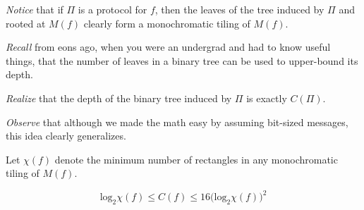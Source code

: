 \documentclass[12pt]{article}
\begin{document}
\begin{description}
\item \emph{Notice} that if $\Pi$ is a protocol for $f$, then the leaves of the tree induced by $\Pi$ and rooted at $M(f)$ clearly form a monochromatic tiling of $M(f)$.
\item \emph{Recall} from eons ago, when you were an undergrad and had to know useful things, that the number of leaves in a binary tree can be used to upper-bound its depth.
\item \emph{Realize} that the depth of the binary tree induced by $\Pi$ is exactly $C(\Pi)$.
\item \emph{Observe} that although we made the math easy by assuming bit-sized messages, this idea clearly generalizes.
\end{description}

Let $\chi(f)$ denote the minimum number of rectangles in any monochromatic tiling of $M(f)$.

\begin{theorem}
\[\text{log}_2 \chi(f) \leq
	C(f) \leq
		16 \big( \text{log}_2 \chi(f) \big)^2
\]
\end{theorem}
\end{document}
